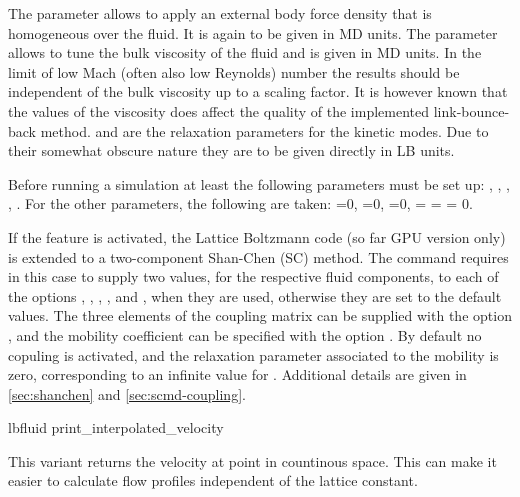 The parameter  allows to apply an external body force
density that is homogeneous over the fluid. It is again to be given in
MD units.  The parameter  allows to tune the bulk
viscosity of the fluid and is given in MD units. In the limit of low
Mach (often also low Reynolds) number the results should be
independent of the bulk viscosity up to a scaling factor. 
It is however known that the values of the viscosity does 
affect the quality of the implemented link-bounce-back method.
 and
 are the relaxation parameters for the kinetic
modes. Due to their somewhat obscure nature they are to be given
directly in LB units.

Before running a simulation at least the following parameters must be
set up: , , , ,
. For the other parameters, the following are taken:
=0, =0, =0,
 =  =  = 0.

If the feature  is activated, the Lattice Boltzmann
code (so far GPU version only) is extended to a two-component
Shan-Chen (SC) method.  The  command requires in this case
to supply two values, for the respective fluid components, to each
of the options , , , ,
 and , when they are used, otherwise
they are set to the default values. The three elements of the
coupling matrix can be supplied with the option ,
and the mobility coefficient can be
specified with the option . By default no copuling is activated,
and the relaxation parameter associated to the mobility is zero, corresponding
to an infinite value for . Additional details are given in
\ref{sec:shanchen} and \ref{sec:scmd-coupling}.

\begin{essyntax}
  lbfluid print_interpolated_velocity   
\end{essyntax}
This variant returns the velocity at point in countinous space. 
This can make it easier to calculate flow profiles independent of
the lattice constant.

